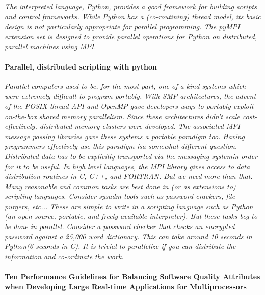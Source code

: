 \documentclass{article}
\begin{document}
{\emph{The interpreted language, Python, provides a good framework for building
scripts and control frameworks. While Python has a (co-routining) thread model,
its basic design is not particularly appropriate for parallel programming. The
pyMPI extension set is designed to provide parallel operations for Python on
distributed, parallel machines using MPI.}

\paragraph{Parallel, distributed scripting with python} \cite{millerparallel}

\emph{Parallel computers used to be, for the most part, one-of-a-kind systems
which were extremely difficult to program portably. With SMP architectures, the
advent of the POSIX thread API and OpenMP gave developers ways to portably
exploit on-the-box shared memory parallelism. Since these architectures
didn't scale cost-effectively, distributed memory clusters were developed. The
associated MPI message passing libraries gave these systems a portable paradigm
too. Having programmers effectively use this paradigm isa somewhat different
question. Distributed data has to be explicitly transported via the messaging
systemin order for it to be useful. In high level languages, the MPI library
gives access to data distribution routines in C, C++, and FORTRAN. But we need
more than that. Many reasonable and common tasks are best done in (or as
extensions to) scripting languages. Consider sysadm tools such as password
crackers, file purgers, etc... These are simple to write in a scripting
language such as Python (an open source, portable, and freely available
interpreter). But these tasks beg to be done in parallel. Consider a
password checker that checks an encrypted password against a 25,000 word
dictionary. This can take around 10 seconds in Python(6 seconds in C). It is
trivial to parallelize if you can distribute the information and co-ordinate
the work.}

\paragraph{Ten Performance Guidelines for Balancing Software Quality Attributes
when Developing Large Real-time Applications for Multiprocessors}
\cite{haggander1999guidelines}

}
\end{document}
